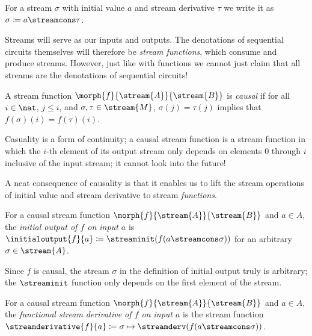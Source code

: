 \begin{notation}
    For a stream \(\sigma\) with initial value \(a\) and stream derivative
    \(\tau\) we write it as \(\sigma \coloneqq a \streamcons \tau\).
\end{notation}

Streams will serve as our inputs and outputs.
The denotations of sequential circuits themselves will therefore be
\emph{stream functions}, which consume and produce streams.
However, just like with functions we cannot just claim that all streams are the
denotations of sequential circuits!

\begin{definition}
    A stream function \(\morph{f}{\stream{A}}{\stream{B}}\) is \emph{causal} if
    for all \(i \in \nat\), \(j \leq i\), and \(\sigma,\tau \in \stream{M}\),
    \(\sigma(j) = \tau(j)\) implies that \(f(\sigma)(i) = f(\tau)(i)\).
\end{definition}

Casuality is a form of continuity; a causal stream function is a stream function
in which the \(i\)-th element of its output stream only depends on elements
\(0\) through \(i\) inclusive of the input stream; it cannot look into the
future!

A neat consequence of causality is that it enables us to lift the stream
operations of initial value and stream derivative to stream \emph{functions}.

\begin{definition}
    For a causal stream function \(\morph{f}{\stream{A}}{\stream{B}}\) and
    \(a \in A\), the \emph{initial output of \(f\) on input \(a\)} is
    \(\initialoutput{f}{a} \coloneqq \streaminit(f(a \streamcons \sigma))\) for an
    arbitrary \(\sigma \in \stream{A}\).
\end{definition}

Since \(f\) is causal, the stream \(\sigma\) in the definition of initial
output truly is arbitrary; the \(\streaminit\) function only depends on the
first element of the stream.

\begin{definition}
    For a causal stream function \(\morph{f}{\stream{A}}{\stream{B}}\) and
    \(a \in A\), the
    \emph{functional stream derivative of \(f\) on input \(a\)} is the
    stream function \(
    \streamderivative{f}{a}
    \coloneqq
    \sigma \mapsto \streamderv(f(a \streamcons \sigma))
    \).
\end{definition}

